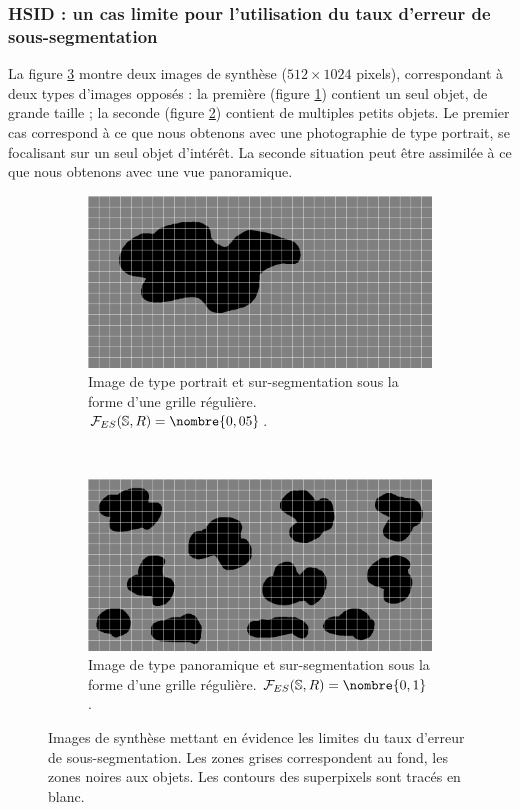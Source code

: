 \subsubsection{HSID : un cas limite pour l'utilisation du taux d'erreur de sous-segmentation}
La figure \ref{fig:prob-ue} montre deux images de synthèse ($512\times1024$ pixels), correspondant à deux types d'images opposés : la première (figure \ref{fig:img-few-bdr}) contient un seul objet, de grande taille ; la seconde (figure \ref{fig:img-plenty-bdr}) contient de multiples petits objets. Le premier cas correspond à ce que nous obtenons avec une photographie de type portrait, se focalisant sur un seul objet d'intérêt. La seconde situation peut être assimilée à ce que nous obtenons avec une vue panoramique. 
\begin{figure}[htb]
	\centering
	
	 \begin{subfigure}[t]{0.45\textwidth}	
			\includegraphics[width=\textwidth]{images/sur-segmentation/UE/01-seg}
		 \caption{Image de type portrait et sur-segmentation sous la forme d'une grille régulière. $\mathcal{F}_{ES}(\mathbb{S},R)=\nombre{0,05}$.}
		 \label{fig:img-few-bdr}
	\end{subfigure}		
	~
	 \begin{subfigure}[t]{0.45\textwidth}	
			\includegraphics[width=\textwidth]{images/sur-segmentation/UE/10-seg}
		 \caption{Image de type panoramique et sur-segmentation sous la forme d'une grille régulière. $\mathcal{F}_{ES}(\mathbb{S},R)=\nombre{0,1}$.}
		 \label{fig:img-plenty-bdr}
	\end{subfigure}	
	\caption{Images de synthèse mettant en évidence les limites du taux d'erreur de sous-segmentation. Les zones grises correspondent au fond, les zones noires aux objets. Les contours des superpixels sont tracés en blanc. }
	\label{fig:prob-ue}
\end{figure}

